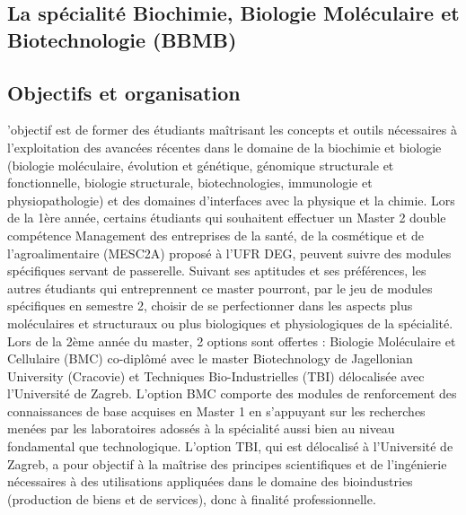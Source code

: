 \documentclass[10pt, a5paper]{report}
\begin{document}
\begin{spacing}{1.5}
\section*{La spécialité Biochimie, Biologie Moléculaire et Biotechnologie (BBMB) }



\subsection*{Objectifs et organisation}

’objectif est de former des étudiants maîtrisant les concepts et outils nécessaires à l'exploitation des avancées récentes dans le domaine de la biochimie et biologie (biologie moléculaire, évolution et génétique, génomique structurale et fonctionnelle, biologie structurale, biotechnologies, immunologie et physiopathologie) et des domaines d'interfaces avec la physique et la chimie. 
Lors de la 1ère année, certains étudiants qui souhaitent effectuer un Master 2 double compétence Management des entreprises de la santé, de la cosmétique et de l’agroalimentaire  (MESC2A) proposé à l’UFR DEG, peuvent suivre des modules spécifiques servant de passerelle. Suivant ses aptitudes et ses préférences, les autres étudiants qui entreprennent ce master pourront, par le jeu de modules spécifiques en semestre 2, choisir de se perfectionner dans les aspects plus moléculaires et structuraux ou plus biologiques et physiologiques de la spécialité. Lors de la 2ème année du master,  2 options sont offertes : Biologie Moléculaire et Cellulaire (BMC) co-diplômé avec le master Biotechnology de Jagellonian University (Cracovie) et Techniques Bio-Industrielles (TBI) délocalisée avec l’Université de Zagreb.
 L’option BMC comporte des modules de renforcement des connaissances de base acquises en Master 1 en s’appuyant sur les recherches menées par les laboratoires adossés à la spécialité aussi bien au niveau fondamental que technologique. 
L’option TBI, qui est délocalisé à l’Université de Zagreb, a pour objectif à la maîtrise des principes scientifiques et de l'ingénierie nécessaires à des utilisations appliquées dans le domaine des bioindustries (production de biens et de services), donc à finalité professionnelle.



\end{spacing}
\end{document}
